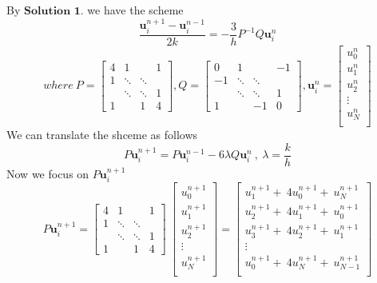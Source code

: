 \documentclass{report}
\begin{document}
By $\textbf{Solution \ 1}$. we have  the  scheme   
 \begin{displaymath}
\frac{\textbf{u}^{n+1}_{i}- \textbf{u}^{n-1}_{i}}{2k}= - \frac{3}{h}P^{-1}Q\textbf{u}^{n}_{i}
 \end{displaymath}
 \begin{displaymath}
where \  P = 
\left[ 
\begin{matrix}
4 & 1 & ~ & 1\\
1 & \ddots & \ddots & ~\\
~ & \ddots & \ddots & 1\\
1 & ~ & 1 & 4
\end{matrix}
\right] 
,
Q =
\left[
\begin{matrix}
0& 1 & ~ & -1\\
-1 & \ddots & \ddots & ~\\
~ & \ddots & \ddots & 1\\
1 & ~ & -1 & 0
\end{matrix}
\right]
,\textbf{u}^{n}_{i} = \left[ 
\begin{matrix}
u^{n}_{0}\\
u^{n}_{1}\\
u^{n}_{2}\\
\vdots\\
u^{n}_{N}\\
\end{matrix}
\right]
\end{displaymath}
We can translate the shceme  as follows
 \begin{displaymath}
P\textbf{u}^{n+1}_{i} = P\textbf{u}^{n-1}_{i}-  6\lambda Q\textbf{u}^{n}_{i} \ ,\ \lambda =\frac{k}{h}
 \end{displaymath}
Now we focus on $P\textbf{u}^{n+1}_{i}$  
 \begin{displaymath}
P\textbf{u}^{n+1}_{i} = 
\left[
\begin{matrix}
4 & 1 & ~ & 1\\
1 & \ddots & \ddots & ~\\
~ & \ddots & \ddots & 1\\
1 & ~ & 1 & 4
\end{matrix}
\right] \ 
\left[
\begin{matrix}
u^{n+1}_{0}\\
u^{n+1}_{1}\\
u^{n+1}_{2}\\
\vdots\\
u^{n+1}_{N}\\
\end{matrix}
\right]=
\left[
\begin{matrix}
u^{n+1}_{1} + \ 4u^{n+1}_{0}+ \ u^{n+1}_{N}\\
u^{n+1}_{2} + \ 4u^{n+1}_{1}+ \ u^{n+1}_{0}\\
u^{n+1}_{3} + \ 4u^{n+1}_{2}+ \ u^{n+1}_{1}\\
\vdots\\
u^{n+1}_{0}+ \ 4u^{n+1}_{N}+ \ u^{n+1}_{N-1}\\
\end{matrix}
\right]
\end{displaymath}
\end{document}

